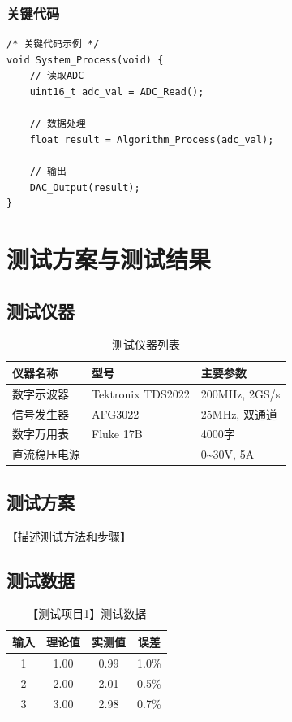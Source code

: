 \documentclass[12pt,a4paper]{ctexart}
\begin{document}
\subsubsection{关键代码}

\begin{lstlisting}[caption={关键算法实现}, label={lst:key_code}]
/* 关键代码示例 */
void System_Process(void) {
    // 读取ADC
    uint16_t adc_val = ADC_Read();
    
    // 数据处理
    float result = Algorithm_Process(adc_val);
    
    // 输出
    DAC_Output(result);
}
\end{lstlisting}

\section{测试方案与测试结果}

\subsection{测试仪器}

\begin{table}[H]
\centering
\caption{测试仪器列表}
\begin{tabular}{lll}
\toprule
\textbf{仪器名称} & \textbf{型号} & \textbf{主要参数} \\
\midrule
数字示波器 & Tektronix TDS2022 & 200MHz, 2GS/s \\
信号发生器 & AFG3022 & 25MHz, 双通道 \\
数字万用表 & Fluke 17B & 4000字 \\
直流稳压电源 & \text{-} & 0\textasciitilde 30V, 5A \\
\bottomrule
\end{tabular}
\end{table}

\subsection{测试方案}

【描述测试方法和步骤】

\subsection{测试数据}

\begin{table}[H]
\centering
\caption{【测试项目1】测试数据}
\begin{tabular}{cccc}
\toprule
\textbf{输入} & \textbf{理论值} & \textbf{实测值} & \textbf{误差} \\
\midrule
1 & 1.00 & 0.99 & 1.0\% \\
2 & 2.00 & 2.01 & 0.5\% \\
3 & 3.00 & 2.98 & 0.7\% \\
\bottomrule
\end{tabular}
\end{table}
\end{document}
